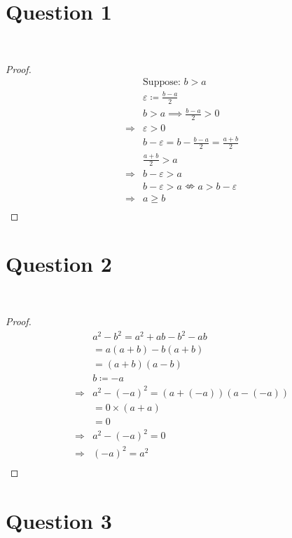 \documentclass{article}
\begin{document}
\section*{Question 1}

~

\begin{proof}
    \begin{align*}
        &\text{Suppose: }b>a\\
        &\varepsilon \coloneqq \frac{b-a}{2}\\
        &b>a\implies \frac{b-a}{2}>0\\
        \Rightarrow&\varepsilon >0\\
        &b-\varepsilon =b-\frac{b-a}{2}=\frac{a+b}{2}\\
        &\frac{a+b}{2}>a\\
        \Rightarrow&b-\varepsilon >a\\
        &b-\varepsilon >a\nLeftrightarrow a>b-\varepsilon\\
        \Rightarrow&a\geqslant b\\
    \end{align*}
\end{proof}

\newpage

\section*{Question 2}

~

\begin{proof}
    \begin{align*}
        &a^2-b^2=a^2+ab-b^2-ab\\
        &=a(a+b)-b(a+b)\\
        &=(a+b)(a-b)\\
        &b\coloneqq -a\\
        \Rightarrow&a^2-(-a)^2=(a+(-a))(a-(-a))\\
        &=0\times (a+a)\\
        &=0\\
        \Rightarrow&a^2-(-a)^2=0\\
        \Rightarrow&(-a)^2=a^2\\
    \end{align*}
\end{proof}

\newpage

\section*{Question 3}
\end{document}
